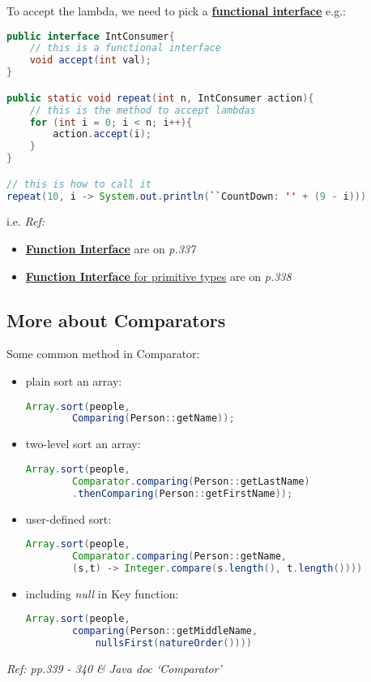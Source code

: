 \documentclass[12pt]{article}
\begin{document}
To accept the lambda, we need to pick a \underline{\textbf{functional interface}} e.g.:
\begin{lstlisting}[language=Java]
public interface IntConsumer{
    // this is a functional interface
    void accept(int val);
}

public static void repeat(int n, IntConsumer action){
    // this is the method to accept lambdas
    for (int i = 0; i < n; i++){
        action.accept(i);
    }
}

// this is how to call it
repeat(10, i -> System.out.println(``CountDown: '' + (9 - i)))
\end{lstlisting}
i.e. \emph{Ref:}
\begin{itemize}
    \item \underline{\textbf{Function Interface}} are on \textit{p.337}
    \item \underline{\textbf{Function Interface} for primitive types} are on \textit{p.338}
\end{itemize}

\subsection{More about Comparators}
Some common method in Comparator:
\begin{itemize}
    \item plain sort an array:
    \begin{lstlisting}[language=Java]
    Array.sort(people,
        Comparing(Person::getName));
    \end{lstlisting}
    \item two-level sort an array:
    \begin{lstlisting}[language=Java]
    Array.sort(people,
        Comparator.comparing(Person::getLastName)
        .thenComparing(Person::getFirstName));
    \end{lstlisting}
    \item user-defined sort:
    \begin{lstlisting}[language=Java]
    Array.sort(people,
        Comparator.comparing(Person::getName,
        (s,t) -> Integer.compare(s.length(), t.length())))
    \end{lstlisting}
    \item including \emph{null} in Key function:
    \begin{lstlisting}[language=Java]
    Array.sort(people, 
        comparing(Person::getMiddleName, 
            nullsFirst(natureOrder())))
    \end{lstlisting}
\end{itemize}
\emph{Ref: pp.339 - 340 \& Java doc `Comparator'}
\end{document}
